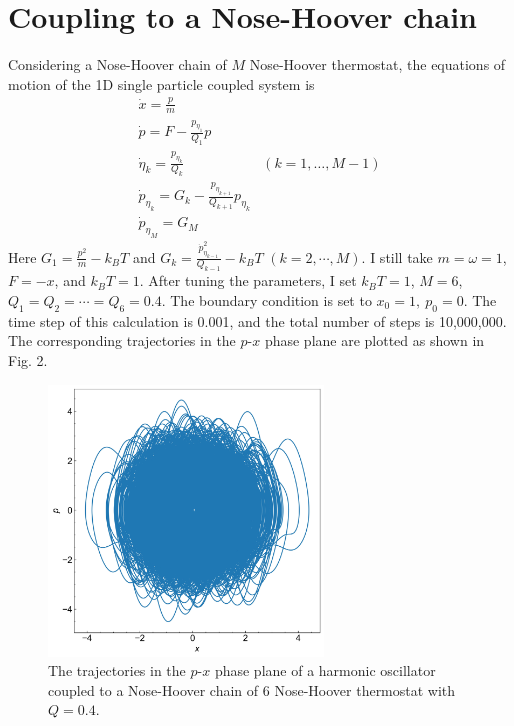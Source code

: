 \documentclass{article}
\begin{document}
\section{Coupling to a Nose-Hoover chain}
Considering a Nose-Hoover chain of $M$ Nose-Hoover thermostat, the equations of motion of the 1D single particle coupled system is
\begin{equation}
    \begin{array}{ll}
        \dot{x}=\frac{p}{m} & \\
        \dot{p}=F-\frac{p_{\eta_1}}{Q_1} p & \\
        \dot{\eta}_k=\frac{p_{\eta_k}}{Q_k} & (k=1, \ldots, M-1) \\
        \dot{p}_{\eta_k}=G_k-\frac{p_{\eta_{k+1}}}{Q_{k+1}} p_{\eta_k} & \\
        \dot{p}_{\eta_M}=G_M
    \end{array}
\end{equation}
Here $G_1=\frac{p^2}{m}-k_B T$ and $G_k=\frac{\dot{p}_{\eta_{k-1}}^2}{Q_{k-1}}-k_B T$ $(k=2, \cdots, M)$. I still take $m = \omega = 1$, $F = -x$, and $k_B T =1$. After tuning the parameters, I set $k_B T = 1$, $M = 6$, $Q_1 = Q_2 = \cdots = Q_6 = 0.4$. The boundary condition is set to $x_0 = 1,\ p_0 = 0$. The time step of this calculation is 0.001, and the total number of steps is 10,000,000. The corresponding trajectories in the $p$-$x$ phase plane are plotted as shown in Fig. 2.

\begin{figure}[h!]
    \centering
    \includegraphics[width=0.65\textwidth]{NHchain.jpg}
    \caption{The trajectories in the $p$-$x$ phase plane of a harmonic oscillator coupled to a Nose-Hoover chain of 6 Nose-Hoover thermostat with $Q = 0.4$.}
\end{figure}
\end{document}

